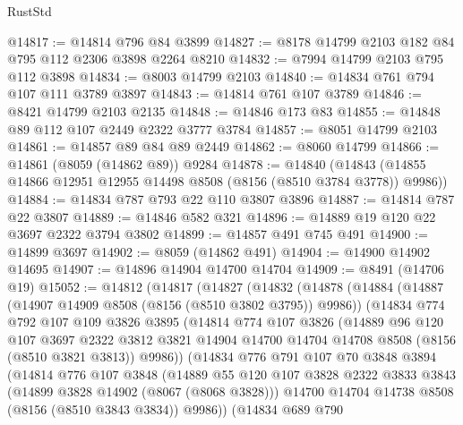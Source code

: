 \begin{lexlean}{RustStd}
\begin{coremodule}
@14817 := @14814 @796 @84 @3899
@14827 := @8178 @14799 @2103 @182 @84 @795 @112 @2306 @3898 @2264 @8210
@14832 := @7994 @14799 @2103 @795 @112 @3898
@14834 := @8003 @14799 @2103
@14840 := @14834 @761 @794 @107 @111 @3789 @3897
@14843 := @14814 @761 @107 @3789
@14846 := @8421 @14799 @2103 @2135
@14848 := @14846 @173 @83
@14855 := @14848 @89 @112 @107 @2449 @2322 @3777 @3784
@14857 := @8051 @14799 @2103
@14861 := @14857 @89 @84 @89 @2449
@14862 := @8060 @14799
@14866 := @14861 (@8059 (@14862 @89)) @9284
@14878 := @14840
    (@14843 (@14855 @14866 @12951 @12955 @14498 @8508 (@8156 (@8510 @3784 @3778)) @9986))
@14884 := @14834 @787 @793 @22 @110 @3807 @3896
@14887 := @14814 @787 @22 @3807
@14889 := @14846 @582 @321
@14896 := @14889 @19 @120 @22 @3697 @2322 @3794 @3802
@14899 := @14857 @491 @745 @491
@14900 := @14899 @3697
@14902 := @8059 (@14862 @491)
@14904 := @14900 @14902 @14695
@14907 := @14896 @14904 @14700 @14704
@14909 := @8491 (@14706 @19)
@15052 := @14812
    (@14817
      (@14827
        (@14832
          (@14878
            (@14884
              (@14887 (@14907 @14909 @8508 (@8156 (@8510 @3802 @3795)) @9986))
              (@14834
                @774
                @792
                @107
                @109
                @3826
                @3895
                (@14814
                  @774
                  @107
                  @3826
                  (@14889
                    @96
                    @120
                    @107
                    @3697
                    @2322
                    @3812
                    @3821
                    @14904
                    @14700
                    @14704
                    @14708
                    @8508
                    (@8156 (@8510 @3821 @3813))
                    @9986))
                (@14834
                  @776
                  @791
                  @107
                  @70
                  @3848
                  @3894
                  (@14814
                    @776
                    @107
                    @3848
                    (@14889
                      @55
                      @120
                      @107
                      @3828
                      @2322
                      @3833
                      @3843
                      (@14899 @3828 @14902 (@8067 (@8068 @3828)))
                      @14700
                      @14704
                      @14738
                      @8508
                      (@8156 (@8510 @3843 @3834))
                      @9986))
                  (@14834
                    @689
                    @790

\end{coremodule}
\end{lexlean}

